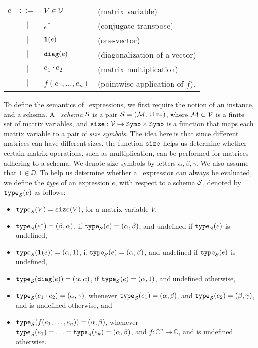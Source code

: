 \medskip

\begin{tabular}{lcll}
$e$ & $::=$ & $V\in \mathcal{V}$ & (matrix variable)\\
 & $|$ & $e^*$ & (conjugate transpose)\\ 
 & $|$ & $\mathbf{1}(e)$ & (one-vector)\\ 
 & $|$ & $\texttt{diag}(e)$ & (diagonalization of a vector)\\  
 & $|$ & $e_1 \cdot e_2$ & (matrix multiplication)\\   
 & $|$ & $f(e_1,\ldots ,e_n)$ & (pointwise application of $f$).    
\end{tabular}

\medskip

To define the semantics of \lang\ expressions, we first require the notion of an instance, and a schema. A \lang\ {\em schema} $\mathcal{S}$ is a pair $\mathcal{S}=(\mathcal{M},\texttt{size})$, where $\mathcal{M}\subset \mathcal{V}$ is a finite set of matrix variables, and $\texttt{size}: \mathcal{V} \mapsto \texttt{Symb}\times \texttt{Symb}$ is a function that maps each matrix variable to a pair of {\em size symbols}. The idea here is that since different matrices can have different sizes, the function $\texttt{size}$ helps us determine whether certain matrix operations, such as multiplication, can be performed for matrices adhering to a schema. We denote size symbols by letters $\alpha,\beta,\gamma$. We also assume that $1\in \DD$. To help us determine whether a \lang\ expression can always be evaluated, we define the {\em type} of an expression $e$, with respect to a schema $\mathcal{S}$, denoted by $\texttt{type}_{\mathcal{S}}(e)$ as follows:
\begin{itemize}
\item $\texttt{type}_{\mathcal{S}}(V) = \texttt{size}(V)$, for a matrix variable $V$,
\item $\texttt{type}_{\mathcal{S}}(e^*) = (\beta,\alpha)$, if $\texttt{type}_{\mathcal{S}}(e)=(\alpha,\beta)$, and undefined if $\texttt{type}_{\mathcal{S}}(e)$ is undefined,
\item $\texttt{type}_{\mathcal{S}}(\mathbf{1}(e)) = (\alpha,1)$, if $\texttt{type}_{\mathcal{S}}(e)=(\alpha,\beta)$, and undefined if $\texttt{type}_{\mathcal{S}}(e)$ is undefined,
\item $\texttt{type}_{\mathcal{S}}(\texttt{diag}(e)) = (\alpha,\alpha)$, if $\texttt{type}_{\mathcal{S}}(e)=(\alpha,1)$, and undefined otherwise,
\item $\texttt{type}_{\mathcal{S}}(e_1 \cdot e_2) = (\alpha,\gamma)$, whenever $\texttt{type}_{\mathcal{S}}(e_1)=(\alpha,\beta)$, and $\texttt{type}_{\mathcal{S}}(e_2)=(\beta,\gamma)$, and is undefined otherwise, and
\item $\texttt{type}_{\mathcal{S}}(f(e_1,\ldots ,e_n)) = (\alpha,\beta)$, whenever $\texttt{type}_{\mathcal{S}}(e_1) = \ldots = \texttt{type}_{\mathcal{S}}(e_k) = (\alpha,\beta)$, and $f:\mathbb{C}^n \mapsto  \mathbb{C}$, and is undefined otherwise.
\end{itemize}

